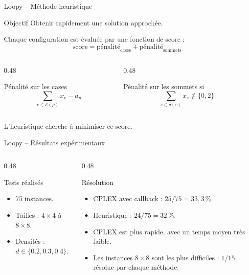 \documentclass[11pt,aspectratio=169]{beamer}
\begin{document}
\begin{frame}{Loopy -- Méthode heuristique}
\small
\begin{block}{Objectif}
Obtenir rapidement une solution approchée.
\end{block}

Chaque configuration est évaluée par une fonction de score :
\[
\text{score}=\text{pénalité}_{\text{cases}}+\text{pénalité}_{\text{sommets}}
\]

\begin{columns}[T,onlytextwidth]
\begin{column}{0.48\textwidth}
\begin{block}{Pénalité sur les cases}
\[
\sum_{e\in\mathcal{E}(p)}x_e-a_p
\]
\end{block}
\end{column}
\begin{column}{0.48\textwidth}
\begin{block}{Pénalité sur les sommets si}
\[
\sum_{e\in\delta(v)}x_e\notin\{0,2\}
\]
\end{block}
\end{column}
\end{columns}

\medskip
L'heuristique cherche à minimiser ce score.
\end{frame}

\begin{frame}{Loopy -- Résultats expérimentaux}
\small
\begin{columns}[T,onlytextwidth]
\begin{column}{0.48\textwidth}
\begin{block}{Tests réalisés}
\begin{itemize}
  \item 75 instances.
  \item Tailles : \(4\times4\) à \(8\times8\).
  \item Densités : \(d\in\{0.2,0.3,0.4\}\).
\end{itemize}
\end{block}
\end{column}
\begin{column}{0.48\textwidth}
\begin{block}{Résolution}
\begin{itemize}
  \item CPLEX avec callback : \(25/75=33{,}3\,\%\).
  \item Heuristique : \(24/75=32\,\%\).
  \item CPLEX est plus rapide, avec un temps moyen très faible.
  \item Les instances \(8\times8\) sont les plus difficiles : \(1/15\) résolue par chaque méthode.
\end{itemize}
\end{block}
\end{column}
\end{columns}
\end{frame}
\end{document}

